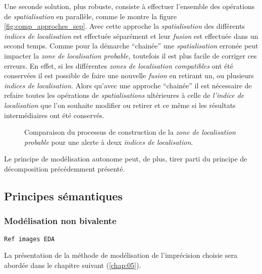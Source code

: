 Une seconde solution, plus robuste, consiste à effectuer l'ensemble
des opérations de \emph{spatialisation} en parallèle, comme le montre
la figure \ref{fig:comp_approches_sep}. Avec cette approche la
\emph{spatialisation} des différents \emph{indices de localisation}
est effectuée séparément et leur \emph{fusion} est effectuée dans un
second temps. Comme pour la démarche \enquote{chainée} une
\emph{spatialisation} erronée peut impacter la \emph{zone de
  localisation probable,} toutefois il est plus facile de corriger ces
erreurs. En effet, si les différentes \emph{zones de localisation
  compatibles} ont été conservées il est possible de faire une
nouvelle \emph{fusion} en retirant un, ou plusieurs \emph{indices de
  localisation.} Alors qu'avec une approche \enquote{chainée} il est
nécessaire de refaire toutes les opérations de \emph{spatialisations}
ultérieures à celle de \emph{l'indice de localisation} que l'on
souhaite modifier ou retirer et ce même si les résultats
intermédiaires ont été conservés.

\begin{figure}
  \centering

  \caption{Comparaison du processus de construction de la \emph{zone
      de localisation probable} pour une alerte à deux \emph{indices
      de localisation}.}
  \label{fig:comp_approches}
\end{figure}

Le principe de modélisation autonome peut, de plus, tirer parti du
principe de décomposition précédemment présenté.


\subsection{Principes sémantiques}

\subsubsection{Modélisation non bivalente}
\texttt{Ref images EDA}



La présentation de la méthode de modélisation de l'imprécision choisie
sera abordée dans le chapitre suivant (\autoref{chap:05}).

